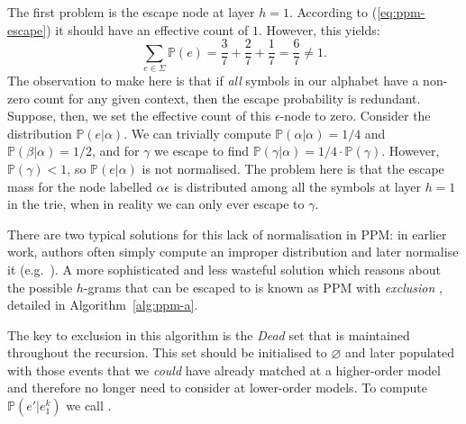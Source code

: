 \documentclass[12pt,a4paper,twoside,openright]{report}
\begin{document}
The first problem is the escape node at layer $h = 1$. According to
(\ref{eq:ppm-escape}) it should have an effective count of $1$. However, this
yields:
$$ \sum_{e \in \Sigma} \mathbb{P}(e) = \frac{3}{7} + \frac{2}{7} + \frac{1}{7} =
\frac{6}{7} \neq 1. $$
The observation to make here is that if \emph{all} symbols in our alphabet have
a non-zero count for any given context, then the escape probability is
redundant. Suppose, then, we set the effective count of this $\epsilon$-node to
zero. Consider the distribution $\mathbb{P}(e|\alpha)$. We can trivially compute
$\mathbb{P}(\alpha|\alpha) = 1/4$ and $\mathbb{P}(\beta|\alpha) = 1/2$, and for
$\gamma$ we escape to find $\mathbb{P}(\gamma|\alpha) = 1/4 \cdot
\mathbb{P}(\gamma)$. However, $\mathbb{P}(\gamma) < 1$, so
$\mathbb{P}(e|\alpha)$ is not normalised. The problem here is that the escape
mass for the node labelled $\alpha\epsilon$ is distributed among all the symbols
at layer $h = 1$ in the trie, when in reality we can only ever escape to
$\gamma$.

There are two typical solutions for this lack of normalisation in PPM: in
earlier work, authors often simply compute an improper distribution and later
normalise it (e.g.\ \cite{conklin1990prediction}). A more sophisticated and less
wasteful solution which reasons about the possible $h$-grams that can be escaped
to is known as PPM with \emph{exclusion} \cite{pearce2004improved}, detailed in
Algorithm~\ref{alg:ppm-a}.

The key to exclusion in this algorithm is the \textit{Dead} set that is
maintained throughout the recursion. This set should be initialised to
$\varnothing$ and later populated with those events that we \emph{could} have
already matched at a higher-order model and therefore no longer need to consider
at lower-order models. To compute $\mathbb{P}(e' | e_1^k)$ we call
.
\end{document}
